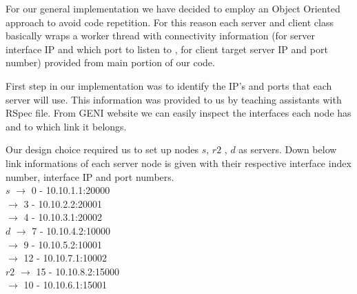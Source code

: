 \documentclass[conference]{IEEEtran}
\begin{document}
For our general implementation we have decided to employ an Object Oriented approach to avoid code repetition. For this reason each server and client class basically wraps a worker thread with connectivity information (for server interface IP and which port to listen to , for client target server IP and port number) provided from main portion of our code.

First step in our implementation was to identify the IP's and ports that each server will use. This information was provided to us by teaching assistants with RSpec file. From GENI website we can easily inspect the interfaces each node has and to which link it belongs. 

Our design choice required us to set up nodes $s$, $r2$ , $d$ as servers. Down below link informations of each server node is given with their respective interface index number, interface IP and port numbers.\\

$s$ $\longrightarrow$ 0 - 10.10.1.1:20000\\
  $\longrightarrow$ 3 - 10.10.2.2:20001\\
  $\longrightarrow$ 4 - 10.10.3.1:20002\\
     
$d$ $\longrightarrow$ 7 - 10.10.4.2:10000\\
  $\longrightarrow$ 9 - 10.10.5.2:10001\\
  $\longrightarrow$ 12 - 10.10.7.1:10002\\
     
$r2$ $\longrightarrow$ 15 - 10.10.8.2:15000\\
   $\longrightarrow$  10 - 10.10.6.1:15001\\
\end{document}
